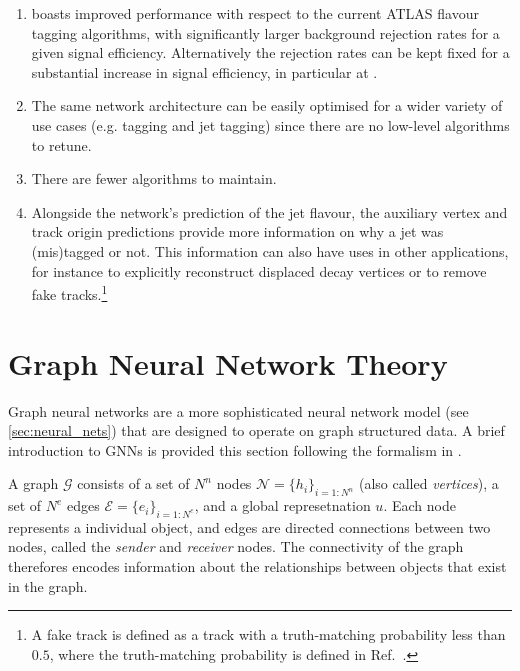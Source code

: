 \newcommand{\fakesfootnote}{%
A fake track is defined as a track with a truth-matching probability less than $0.5$, where the truth-matching probability is defined in Ref.~\cite{PERF-2015-08}.
}
\begin{enumerate}
    \item \GNN boasts improved performance with respect to the current ATLAS flavour tagging algorithms, with significantly larger background rejection rates for a given signal efficiency. Alternatively the rejection rates can be kept fixed for a substantial increase in signal efficiency, in particular at \highpt.
    \item The same network architecture can be easily optimised for a wider variety of use cases (e.g. \cjet tagging and \highpt jet tagging) since there are no low-level algorithms to retune.
    \item There are fewer algorithms to maintain.
    \item Alongside the network's prediction of the jet flavour, the auxiliary vertex and track origin predictions provide more information on why a jet was (mis)tagged or not. This information can also have uses in other applications, for instance to explicitly reconstruct displaced decay vertices or to remove fake tracks.\footnote{\fakesfootnote}
\end{enumerate}


\section{Graph Neural Network Theory}\label{sec:gnn_theory}

Graph neural networks are a more sophisticated neural network model (see \cref{sec:neural_nets}) that are designed to operate on graph structured data.
A brief introduction to GNNs is provided this section following the formalism in .

A graph $\mathcal{G}$ consists of a set of $N^n$ nodes $\mathcal{N} = \{h_i\}_{i=1:N^n}$ (also called \textit{vertices}), a set of $N^e$ edges $\mathcal{E} = \{e_i\}_{i=1:N^e}$, and a global represetnation $u$.
Each node represents a individual object, and edges are directed connections between two nodes, called the \textit{sender} and \textit{receiver} nodes.
The connectivity of the graph therefores encodes information about the relationships between objects that exist in the graph.

